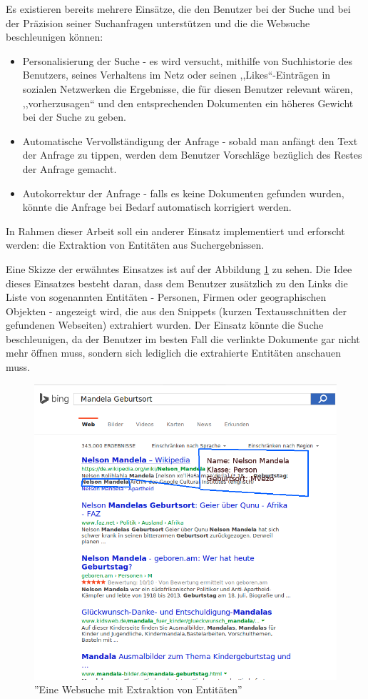 Es existieren bereits mehrere Einsätze, die den Benutzer bei der Suche und bei der Präzision seiner Suchanfragen unterstützen und die die Websuche beschleunigen können:
\begin{itemize}
\item Personalisierung der Suche\cite{noll2007web} - es wird versucht, mithilfe von Suchhistorie des Benutzers, seines Verhaltens im Netz oder seinen ,,Likes``-Einträgen in sozialen Netzwerken die Ergebnisse, die für diesen Benutzer relevant wären, ,,vorherzusagen`` und den entsprechenden Dokumenten ein höheres Gewicht bei der Suche zu geben.
\item Automatische Vervollständigung der Anfrage - sobald man anfängt den Text der Anfrage zu tippen, werden dem Benutzer Vorschläge bezüglich des Restes der Anfrage gemacht.
\item Autokorrektur der Anfrage - falls es keine Dokumenten gefunden wurden, könnte die Anfrage bei Bedarf automatisch korrigiert werden.
\end{itemize}

In Rahmen dieser Arbeit soll ein anderer Einsatz implementiert und erforscht werden: die Extraktion von Entitäten aus Suchergebnissen. 

Eine Skizze der erwähntes Einsatzes ist auf der Abbildung \ref{fig:bing-and-entity} zu sehen. Die Idee dieses Einsatzes besteht daran, dass dem Benutzer zusätzlich zu den Links die Liste von sogenannten Entitäten - Personen, Firmen oder geographischen Objekten - angezeigt wird, die aus den Snippets (kurzen Textausschnitten der gefundenen Webseiten) extrahiert wurden. Der Einsatz könnte die Suche beschleunigen, da der Benutzer im besten Fall die verlinkte Dokumente gar nicht mehr öffnen muss, sondern sich lediglich die extrahierte Entitäten anschauen muss.

\begin{figure}
\centering
\includegraphics[width=1\textwidth]{Bilder/bing-and-entity.png}
\caption{''Eine Websuche mit Extraktion von Entitäten''}
\label{fig:bing-and-entity}
\end{figure}

